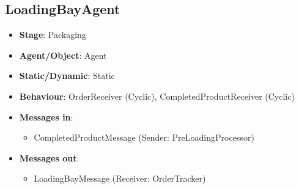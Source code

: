 \documentclass[12pt]{article}
\begin{document}
\subsection{LoadingBayAgent}
\begin{itemize}
    \item \textbf{Stage}: Packaging
    \item \textbf{Agent/Object}: Agent
    \item \textbf{Static/Dynamic}: Static
    \item \textbf{Behaviour}: OrderReceiver (Cyclic), CompletedProductReceiver (Cyclic)
    \item \textbf{Messages in}:
        \begin{itemize}
            \item CompletedProductMessage (Sender: PreLoadingProcessor)
        \end{itemize}
    \item \textbf{Messages out}:
        \begin{itemize}
            \item LoadingBayMessage (Receiver: OrderTracker)
        \end{itemize}
\end{itemize}
\end{document}
